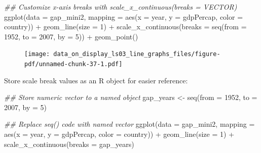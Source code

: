 \documentclass[
  letterpaper,
  DIV=11,
  numbers=noendperiod]{scrreprt}
\newenvironment{Shaded}{\begin{snugshade}}{\end{snugshade}}
\newcommand{\AttributeTok}[1]{\textcolor[rgb]{0.40,0.45,0.13}{#1}}
\newcommand{\DecValTok}[1]{\textcolor[rgb]{0.68,0.00,0.00}{#1}}
\newcommand{\DocumentationTok}[1]{\textcolor[rgb]{0.37,0.37,0.37}{\textit{#1}}}
\newcommand{\FunctionTok}[1]{\textcolor[rgb]{0.28,0.35,0.67}{#1}}
\newcommand{\NormalTok}[1]{\textcolor[rgb]{0.00,0.23,0.31}{#1}}
\newcommand{\OtherTok}[1]{\textcolor[rgb]{0.00,0.23,0.31}{#1}}
\newcommand{\SpecialCharTok}[1]{\textcolor[rgb]{0.37,0.37,0.37}{#1}}
\begin{document}
\begin{Shaded}
\begin{Highlighting}[]
\DocumentationTok{\#\# Customize x{-}axis breaks with \textasciigrave{}scale\_x\_continuous(breaks = VECTOR)\textasciigrave{}}
\FunctionTok{ggplot}\NormalTok{(}\AttributeTok{data =}\NormalTok{ gap\_mini2, }
       \AttributeTok{mapping =} \FunctionTok{aes}\NormalTok{(}\AttributeTok{x =}\NormalTok{ year, }
                     \AttributeTok{y =}\NormalTok{ gdpPercap, }
                     \AttributeTok{color =}\NormalTok{ country)) }\SpecialCharTok{+}
  \FunctionTok{geom\_line}\NormalTok{(}\AttributeTok{size =} \DecValTok{1}\NormalTok{) }\SpecialCharTok{+}
  \FunctionTok{scale\_x\_continuous}\NormalTok{(}\AttributeTok{breaks =} \FunctionTok{seq}\NormalTok{(}\AttributeTok{from =} \DecValTok{1952}\NormalTok{, }\AttributeTok{to =} \DecValTok{2007}\NormalTok{, }\AttributeTok{by =} \DecValTok{5}\NormalTok{)) }\SpecialCharTok{+}
  \FunctionTok{geom\_point}\NormalTok{()}
\end{Highlighting}
\end{Shaded}

\begin{figure}[H]

{\centering \texttt{[image: data\_on\_display\_ls03\_line\_graphs\_files/figure-pdf/unnamed-chunk-37-1.pdf]}

}

\end{figure}

Store scale break values as an R object for easier reference:

\begin{Shaded}
\begin{Highlighting}[]
\DocumentationTok{\#\# Store numeric vector to a named object}
\NormalTok{gap\_years }\OtherTok{\textless{}{-}} \FunctionTok{seq}\NormalTok{(}\AttributeTok{from =} \DecValTok{1952}\NormalTok{, }\AttributeTok{to =} \DecValTok{2007}\NormalTok{, }\AttributeTok{by =} \DecValTok{5}\NormalTok{)}
\end{Highlighting}
\end{Shaded}

\begin{Shaded}
\begin{Highlighting}[]
\DocumentationTok{\#\# Replace seq() code with named vector}
\FunctionTok{ggplot}\NormalTok{(}\AttributeTok{data =}\NormalTok{ gap\_mini2, }
       \AttributeTok{mapping =} \FunctionTok{aes}\NormalTok{(}\AttributeTok{x =}\NormalTok{ year, }
                     \AttributeTok{y =}\NormalTok{ gdpPercap, }
                     \AttributeTok{color =}\NormalTok{ country)) }\SpecialCharTok{+}
  \FunctionTok{geom\_line}\NormalTok{(}\AttributeTok{size =} \DecValTok{1}\NormalTok{) }\SpecialCharTok{+}
  \FunctionTok{scale\_x\_continuous}\NormalTok{(}\AttributeTok{breaks =}\NormalTok{ gap\_years)}
\end{Highlighting}
\end{Shaded}
\end{document}
